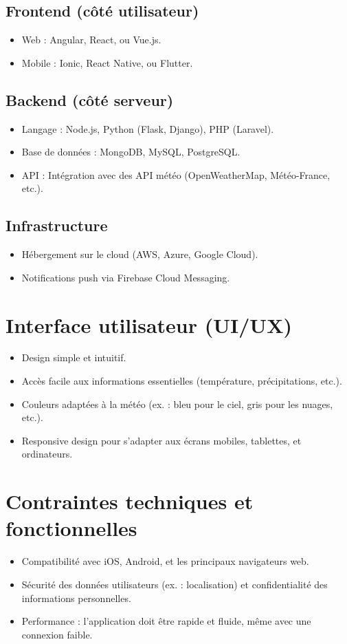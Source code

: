 \documentclass[a4paper,12pt]{article}
\begin{document}
\subsection{Frontend (côté utilisateur)}
\begin{itemize}
    \item Web : Angular, React, ou Vue.js.
    \item Mobile : Ionic, React Native, ou Flutter.
\end{itemize}

\subsection{Backend (côté serveur)}
\begin{itemize}
    \item Langage : Node.js, Python (Flask, Django), PHP (Laravel).
    \item Base de données : MongoDB, MySQL, PostgreSQL.
    \item API : Intégration avec des API météo (OpenWeatherMap, Météo-France, etc.).
\end{itemize}

\subsection{Infrastructure}
\begin{itemize}
    \item Hébergement sur le cloud (AWS, Azure, Google Cloud).
    \item Notifications push via Firebase Cloud Messaging.
\end{itemize}

\section{Interface utilisateur (UI/UX)}
\begin{itemize}
    \item Design simple et intuitif.
    \item Accès facile aux informations essentielles (température, précipitations, etc.).
    \item Couleurs adaptées à la météo (ex. : bleu pour le ciel, gris pour les nuages, etc.).
    \item Responsive design pour s'adapter aux écrans mobiles, tablettes, et ordinateurs.
\end{itemize}

\section{Contraintes techniques et fonctionnelles}
\begin{itemize}
    \item Compatibilité avec iOS, Android, et les principaux navigateurs web.
    \item Sécurité des données utilisateurs (ex. : localisation) et confidentialité des informations personnelles.
    \item Performance : l'application doit être rapide et fluide, même avec une connexion faible.
\end{itemize}
\end{document}
